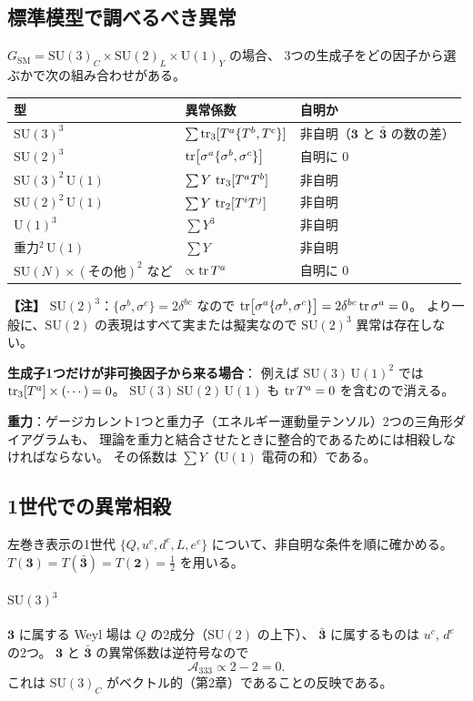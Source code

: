 \documentclass[uplatex,dvipdfmx,a4paper,11pt,openany]{jsbook}
\newenvironment{note}{\vspace{1ex}\par\footnotesize\noindent\textbf{【注】}}{\par\vspace{1ex}}
\numberwithin{equation}{chapter}
\theoremstyle{definition}
\theoremstyle{plain}
\theoremstyle{remark}
\newcommand{\SM}{\mathrm{SM}}
\newcommand{\SU}{\mathrm{SU}}
\newcommand{\U}{\mathrm{U}}
\begin{document}
\subsection{標準模型で調べるべき異常}
$G_{\SM}=\SU(3)_C\times\SU(2)_L\times\U(1)_Y$ の場合、
3つの生成子をどの因子から選ぶかで次の組み合わせがある。
\begin{center}
\renewcommand{\arraystretch}{1.3}
\begin{tabular}{lll}
\toprule
型 & 異常係数 & 自明か\\
\midrule
$\SU(3)^3$ & $\sum\tr_3[T^a\{T^b,T^c\}]$ & 非自明（$\mathbf3$ と $\bar{\mathbf3}$ の数の差）\\
$\SU(2)^3$ & $\tr[\sigma^a\{\sigma^b,\sigma^c\}]$ & 自明に $0$\\
$\SU(3)^2\,\U(1)$ & $\sum Y\,\tr_3[T^aT^b]$ & 非自明\\
$\SU(2)^2\,\U(1)$ & $\sum Y\,\tr_2[T^iT^j]$ & 非自明\\
$\U(1)^3$ & $\sum Y^3$ & 非自明\\
重力$^2\,\U(1)$ & $\sum Y$ & 非自明\\
$\SU(N)\times(\text{その他})^2$ など & $\propto\tr T^a$ & 自明に $0$\\
\bottomrule
\end{tabular}
\end{center}
\begin{note}
\textbf{$\SU(2)^3$}：$\{\sigma^b,\sigma^c\}=2\delta^{bc}$ なので
$\tr[\sigma^a\{\sigma^b,\sigma^c\}]=2\delta^{bc}\tr\sigma^a=0$。
より一般に、$\SU(2)$ の表現はすべて実または擬実なので $\SU(2)^3$ 異常は存在しない。

\textbf{生成子1つだけが非可換因子から来る場合}：
例えば $\SU(3)\,\U(1)^2$ では $\tr_3[T^a]\times(\cdots)=0$。
$\SU(3)\,\SU(2)\,\U(1)$ も $\tr T^a=0$ を含むので消える。

\textbf{重力}：ゲージカレント1つと重力子（エネルギー運動量テンソル）2つの三角形ダイアグラムも、
理論を重力と結合させたときに整合的であるためには相殺しなければならない。
その係数は $\sum Y$（$\U(1)$ 電荷の和）である。
\end{note}
\subsection{1世代での異常相殺}
左巻き表示の1世代 $\{Q,u^c,d^c,L,e^c\}$ について、非自明な条件を順に確かめる。
$T(\mathbf3)=T(\bar{\mathbf3})=T(\mathbf2)=\frac12$ を用いる。
\paragraph{$\SU(3)^3$}
$\mathbf3$ に属する Weyl 場は $Q$ の2成分（$\SU(2)$ の上下）、
$\bar{\mathbf3}$ に属するものは $u^c$, $d^c$ の2つ。
$\mathbf3$ と $\bar{\mathbf3}$ の異常係数は逆符号なので
\begin{equation}
\mathcal A_{333}\propto2-2=0 .
\end{equation}
これは $\SU(3)_C$ がベクトル的（第2章）であることの反映である。
\end{document}
